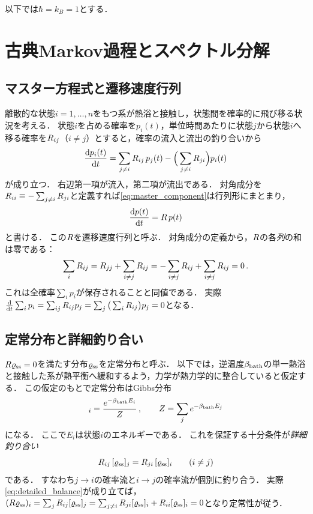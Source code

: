 \documentclass[a4paper,11pt,onecolumn]{jlreq}
\begin{document}
以下では$\hbar=k_B=1$とする．

\section{古典Markov過程とスペクトル分解}
\label{sec:markov}

\subsection{マスター方程式と遷移速度行列}
\label{sec:markov_master}

離散的な状態$i=1,\dots,n$をもつ系が熱浴と接触し，状態間を確率的に飛び移る状況を考える．
状態$i$を占める確率を$p_i(t)$，単位時間あたりに状態$j$から状態$i$へ移る確率を$R_{ij}$（$i\neq j$）とすると，確率の流入と流出の釣り合いから
\begin{equation}
  \dv{p_i(t)}{t}
  = \sum_{j\neq i}R_{ij}\,p_j(t) - \Big(\sum_{j\neq i}R_{ji}\Big)p_i(t)
  \label{eq:master_component}
\end{equation}
が成り立つ．
右辺第一項が流入，第二項が流出である．
対角成分を$R_{ii}\equiv-\sum_{j\neq i}R_{ji}$と定義すれば\eqref{eq:master_component}は行列形にまとまり，
\begin{equation}
  \dv{p(t)}{t} = R\,p(t)
  \label{eq:master}
\end{equation}
と書ける．
この$R$を遷移速度行列と呼ぶ．
対角成分の定義から，$R$の各\emph{列}の和は零である：
\begin{equation}
  \sum_i R_{ij} = R_{jj} + \sum_{i\neq j}R_{ij}
  = -\sum_{i\neq j}R_{ij} + \sum_{i\neq j}R_{ij} = 0\,.
  \label{eq:conservation}
\end{equation}
これは全確率$\sum_i p_i$が保存されることと同値である．
実際$\dv{t}\sum_i p_i = \sum_{ij}R_{ij}p_j = \sum_j\big(\sum_iR_{ij}\big)p_j = 0$となる．

\subsection{定常分布と詳細釣り合い}
\label{sec:markov_db}

$R\varrho_{\mathrm{ss}}=0$を満たす分布$\varrho_{\mathrm{ss}}$を定常分布と呼ぶ．
以下では，逆温度$\beta_{\mathrm{bath}}$の単一熱浴と接触した系が熱平衡へ緩和するよう，力学が熱力学的に整合していると仮定する．
この仮定のもとで定常分布はGibbs分布
\begin{equation}
  [\ssv]_i = \frac{\ee^{-\betabath E_i}}{Z}\,,
  \qquad Z=\sum_j \ee^{-\betabath E_j}
  \label{eq:gibbs}
\end{equation}
になる．
ここで$E_i$は状態$i$のエネルギーである．
これを保証する十分条件が\emph{詳細釣り合い}
\begin{equation}
  R_{ij}\,[\varrho_{\mathrm{ss}}]_j = R_{ji}\,[\varrho_{\mathrm{ss}}]_i
  \qquad (i\neq j)
  \label{eq:detailed_balance}
\end{equation}
である．
すなわち$j\to i$の確率流と$i\to j$の確率流が個別に釣り合う．
実際\eqref{eq:detailed_balance}が成り立てば，$(R\varrho_{\mathrm{ss}})_i=\sum_jR_{ij}[\varrho_{\mathrm{ss}}]_j=\sum_{j\neq i}R_{ji}[\varrho_{\mathrm{ss}}]_i+R_{ii}[\varrho_{\mathrm{ss}}]_i=0$となり定常性が従う．
\end{document}
